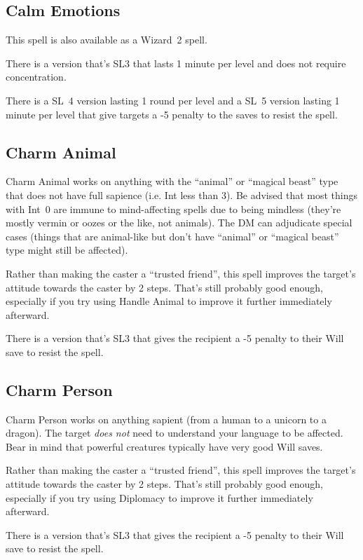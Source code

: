 %
\subsection{Calm Emotions}

This spell is also available as a Wizard~2 spell.

There is a version that's SL3 that lasts 1 minute per level and does not
require concentration.

There is a SL~4 version lasting 1 round per level and a SL~5 version
lasting 1 minute per level that give targets a -5 penalty to the saves to
resist the spell.
%

%
\subsection{Charm Animal}

Charm Animal works on anything with the ``animal'' or ``magical beast''
type that does not have full sapience (i.e. Int less than 3). Be advised
that most things with Int~0 are immune to mind-affecting spells due to
being mindless (they're mostly vermin or oozes or the like, not animals).
The DM can adjudicate special cases (things that are animal-like but don't
have ``animal'' or ``magical beast'' type might still be affected).

Rather than making the caster a ``trusted friend'', this spell improves
the target's attitude towards the caster by 2 steps. That's still probably
good enough, especially if you try using Handle Animal to improve it
further immediately afterward.

There is a version that's SL3 that gives the recipient a -5 penalty to
their Will save to resist the spell.
%

%
\subsection{Charm Person}

Charm Person works on anything sapient (from a human to a unicorn to a
dragon). The target \textit{does not} need to understand your language
to be affected. Bear in mind that powerful creatures typically have very
good Will saves.

Rather than making the caster a ``trusted friend'', this spell improves
the target's attitude towards the caster by 2 steps. That's still probably
good enough, especially if you try using Diplomacy to improve it further
immediately afterward.

There is a version that's SL3 that gives the recipient a -5 penalty to
their Will save to resist the spell.
%

